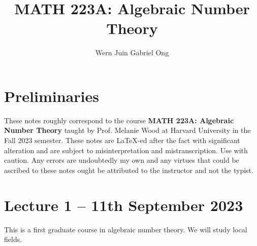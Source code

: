 \documentclass{amsart}
\theoremstyle{definition}
\numberwithin{equation}{section}
\begin{document}
\large
\title[Algebraic Number Theory]{MATH 223A: Algebraic Number Theory}
\author{Wern Juin Gabriel Ong}
\address{Bowdoin College, Brunswick, Maine 04011}
\maketitle
\section*{Preliminaries}
These notes roughly correspond to the course \textbf{MATH 223A: Algebraic Number Theory} taught by Prof. Melanie Wood at Harvard University in the Fall 2023 semester. These notes are \LaTeX-ed after the fact with significant alteration and are subject to misinterpretation and mistranscription. Use with caution. Any errors are undoubtedly my own and any virtues that could be ascribed to these notes ought be attributed to the instructor and not the typist. 
\tableofcontents
\section{Lecture 1 -- 11th September 2023}
This is a first graduate course in algebraic number theory. We will study local fields. 
\end{document}
